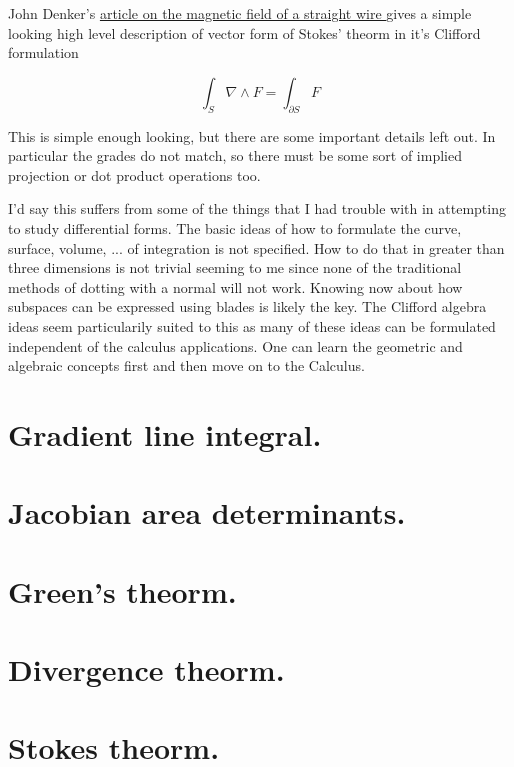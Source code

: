 \documentclass{article}
\newcommand{\grad}[0]{\nabla}
\begin{document}
John Denker's 
\href{ http://www.av8n.com/physics/straight-wire.pdf }{ article on the
magnetic field of a straight wire }
gives a simple looking high level description of vector form of Stokes'
theorm in it's Clifford formulation

\begin{equation}\label{eqn:stokes}
\int_S \grad \wedge F = \int_{\partial S} F
\end{equation}

This is simple enough looking, but there are some important details left
out.  In particular the grades do not match, so there must be some sort of
implied projection or dot product operations too.

I'd say this suffers from some of the things that I had trouble with in
attempting to study differential forms.  The basic ideas of how to formulate
the curve, surface, volume, ... of integration is not specified.  How to do
that in greater than three dimensions is not trivial seeming to me since
none of the traditional methods of dotting with a normal will not work.
Knowing now about how subspaces can be expressed using blades is likely the
key.  The Clifford algebra ideas seem particularily suited to this as many
of these ideas can be formulated independent of the calculus applications.
One can learn the geometric and algebraic concepts first and then move on
to the Calculus.

\section{ Gradient line integral. }

\section{ Jacobian area determinants. }

\section{ Green's theorm. }

\section{ Divergence theorm. }

\section{ Stokes theorm. }
\end{document}
